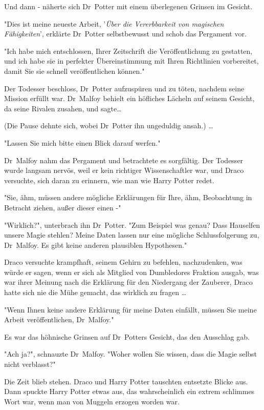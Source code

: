 {Und dann - näherte sich Dr~Potter mit einem überlegenen Grinsen im Gesicht.

"Dies ist meine neueste Arbeit, '\emph{Über die Vererbbarkeit von magischen Fähigkeiten}', erklärte Dr~Potter selbstbewusst und schob das Pergament vor.

"Ich habe mich entschlossen, Ihrer Zeitschrift die Veröffentlichung zu gestatten, und ich habe sie in perfekter Übereinstimmung mit Ihren Richtlinien vorbereitet, damit Sie sie schnell veröffentlichen können."

Der Todesser beschloss, Dr~Potter aufzuspüren und zu töten, nachdem seine Mission erfüllt war. Dr~Malfoy behielt ein höfliches Lächeln auf seinem Gesicht, da seine Rivalen zusahen, und sagte…

(Die Pause dehnte sich, wobei Dr~Potter ihn ungeduldig ansah.) …

"Lassen Sie mich bitte einen Blick darauf werfen."

Dr~Malfoy nahm das Pergament und betrachtete es sorgfältig. Der Todesser wurde langsam nervös, weil er kein richtiger Wissenschaftler war, und Draco versuchte, sich daran zu erinnern, wie man wie Harry Potter redet.

"Sie, ähm, müssen andere mögliche Erklärungen für Ihre, ähm, Beobachtung in Betracht ziehen, außer dieser einen -"

"Wirklich?", unterbrach ihn Dr~Potter. "Zum Beispiel was genau? Dass Hauselfen unsere Magie stehlen? Meine Daten lassen nur eine mögliche Schlussfolgerung zu, Dr~Malfoy. Es gibt keine anderen plausiblen Hypothesen."

Draco versuchte krampfhaft, seinem Gehirn zu befehlen, nachzudenken, was würde er sagen, wenn er sich als Mitglied von Dumbledores Fraktion ausgab, was war ihrer Meinung nach die Erklärung für den Niedergang der Zauberer, Draco hatte sich nie die Mühe gemacht, das wirklich zu fragen …

"Wenn Ihnen keine andere Erklärung für meine Daten einfällt, müssen Sie meine Arbeit veröffentlichen, Dr~Malfoy."

Es war das höhnische Grinsen auf Dr~Potters Gesicht, das den Ausschlag gab.

"Ach ja?", schnauzte Dr~Malfoy. "Woher wollen Sie wissen, dass die Magie selbst nicht verblasst?"

Die Zeit blieb stehen. Draco und Harry Potter tauschten entsetzte Blicke aus. Dann spuckte Harry Potter etwas aus, das wahrscheinlich ein extrem schlimmes Wort war, wenn man von Muggeln erzogen worden war.

}
